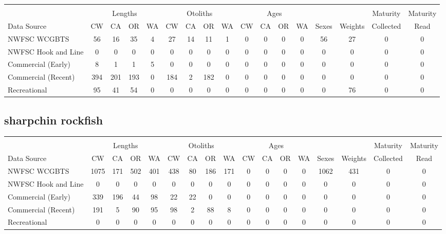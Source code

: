 \documentclass[12pt,]{article}
\begin{document}
\begin{table}[ht]
\centering
\begingroup\fontsize{10pt}{10pt}\selectfont
\begin{tabular}{|l|cccc|cccc|cccc|c|c|c|c|}
  \hline
 &  &  &  &  &  &  &  &  &  &  &  &  &  &  &  &  \\ 
   & \multicolumn{4}{c}{Lengths} &  \multicolumn{4}{c}{Otoliths} & \multicolumn{4}{c}{Ages} &  & & Maturity & Maturity\\
 Data Source & CW & CA & OR & WA & CW & CA & OR & WA & CW & CA & OR & WA & Sexes & Weights & Collected & Read\\
 \hline
NWFSC WCGBTS & 56 & 16 & 35 & 4 & 27 & 14 & 11 & 1 & 0 & 0 & 0 & 0 & 56 & 27 & 0 & 0 \\ 
  NWFSC Hook and Line & 0 & 0 & 0 & 0 & 0 & 0 & 0 & 0 & 0 & 0 & 0 & 0 & 0 & 0 & 0 & 0 \\ 
  Commercial (Early) & 8 & 1 & 1 & 5 & 0 & 0 & 0 & 0 & 0 & 0 & 0 & 0 & 0 & 0 & 0 & 0 \\ 
  Commercial (Recent) & 394 & 201 & 193 & 0 & 184 & 2 & 182 & 0 & 0 & 0 & 0 & 0 & 0 & 0 & 0 & 0 \\ 
  Recreational & 95 & 41 & 54 & 0 & 0 & 0 & 0 & 0 & 0 & 0 & 0 & 0 & 0 & 76 & 0 & 0 \\ 
   \hline
\end{tabular}
\endgroup
\end{table}

\FloatBarrier  

\newpage  

\subsection{sharpchin rockfish}\label{sharpchin-rockfish}

\begin{table}[ht]
\centering
\begingroup\fontsize{10pt}{10pt}\selectfont
\begin{tabular}{|l|cccc|cccc|cccc|c|c|c|c|}
  \hline
 &  &  &  &  &  &  &  &  &  &  &  &  &  &  &  &  \\ 
   & \multicolumn{4}{c}{Lengths} &  \multicolumn{4}{c}{Otoliths} & \multicolumn{4}{c}{Ages} &  & & Maturity & Maturity\\
 Data Source & CW & CA & OR & WA & CW & CA & OR & WA & CW & CA & OR & WA & Sexes & Weights & Collected & Read\\
 \hline
NWFSC WCGBTS & 1075 & 171 & 502 & 401 & 438 & 80 & 186 & 171 & 0 & 0 & 0 & 0 & 1062 & 431 & 0 & 0 \\ 
  NWFSC Hook and Line & 0 & 0 & 0 & 0 & 0 & 0 & 0 & 0 & 0 & 0 & 0 & 0 & 0 & 0 & 0 & 0 \\ 
  Commercial (Early) & 339 & 196 & 44 & 98 & 22 & 22 & 0 & 0 & 0 & 0 & 0 & 0 & 0 & 0 & 0 & 0 \\ 
  Commercial (Recent) & 191 & 5 & 90 & 95 & 98 & 2 & 88 & 8 & 0 & 0 & 0 & 0 & 0 & 0 & 0 & 0 \\ 
  Recreational & 0 & 0 & 0 & 0 & 0 & 0 & 0 & 0 & 0 & 0 & 0 & 0 & 0 & 0 & 0 & 0 \\ 
   \hline
\end{tabular}
\endgroup
\end{table}
\end{document}
